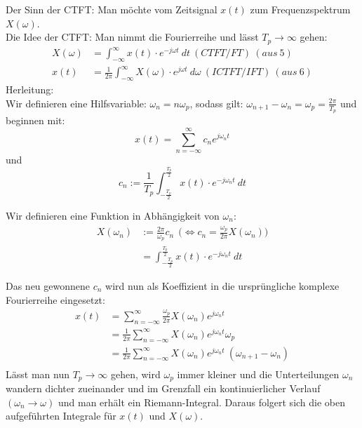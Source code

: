 \documentclass[12pt,a4paper]{scrartcl}
\begin{document}
  \noindent Der Sinn der CTFT: Man möchte vom Zeitsignal $x(t)$ zum Frequenzspektrum $X(\omega)$. \\
  \noindent Die Idee der CTFT: Man nimmt die Fourierreihe und lässt $T_p \to \infty$ gehen: \\
  \begin{equation}
    \label{eq:4}
      \begin{split}
      X(\omega) &= \int_{-\infty}^{ \infty} x(t) \cdot e^{-j \omega t}\ d t\ (CTFT/FT) \ (aus\ 5) \\
      x(t) &= \frac{1}{2\pi} \int_{-\infty}^{ \infty} X(\omega) \cdot e^{j \omega t}\ d \omega\ (ICTFT/IFT) \ (aus\ 6) 
      \end{split}
    \end{equation}
 \noindent   Herleitung:\\
  \noindent Wir definieren eine Hilfsvariable: $\omega_n = n\omega_p$, sodass gilt:
  $\omega_{n+1} - \omega_n = \omega_p = \frac{2\pi}{T_p}$ und beginnen mit:
  $$x(t) = \sum_{n=-\infty}^{\infty} c_n e^{j \omega_n t}$$
  und
  $$c_n := \frac{1}{T_p}\int_{-\frac{T_p}{2}}^{\frac{T_p}{2}}x(t) \cdot e^{-j \omega_n t}\ dt$$

  \noindent Wir definieren eine Funktion in Abhängigkeit von $\omega_n$:
  \begin{equation}
  \label{eq:5}
    \begin{split}
    X(\omega_n) &:= \frac{2\pi}{\omega_p}c_n\ \ \big( \Leftrightarrow c_n = \frac{\omega_p}{2\pi}X(\omega_n)\big)\\
    &= \int_{-\frac{T_p}{2}}^{\frac{T_p}{2}}x(t) \cdot e^{-j \omega_n t}\ d t
    \end{split}
  \end{equation}

  \noindent Das neu gewonnene $c_n$ wird nun als Koeffizient in die ursprüngliche komplexe Fourierreihe eingesetzt:
  \begin{equation}
    \label{eq:6}
      \begin{split}
      x(t) &= \sum_{n=-\infty}^{\infty}\frac{\omega_p}{2\pi}X(\omega_n)e^{j\omega_n t}\\
      &= \frac{1}{2\pi} \sum_{n=-\infty}^{\infty} X(\omega_n) e^{j\omega_n t} \omega_p \\
      &= \frac{1}{2\pi} \sum_{n=-\infty}^{\infty} X(\omega_n) e^{j\omega_n t} \ (\omega_{n + 1} - \omega_n)  \\
      \end{split}
    \end{equation}
    \noindent Lässt man nun $T_p \to \infty$ gehen, wird $\omega_p$ immer kleiner und die Unterteilungen $\omega_n$ wandern dichter zueinander
    und im Grenzfall ein kontinuierlicher Verlauf $(\omega_ n \to \omega)$ und man erhält ein Riemann-Integral. Daraus folgert sich die oben aufgeführten Integrale für $x(t)$ und $X(\omega)$.\\
\end{document}
